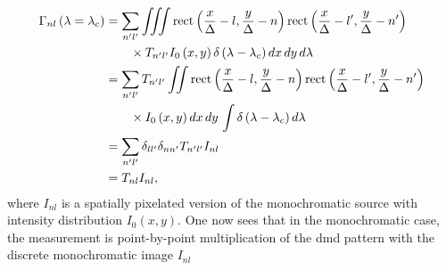\begin{align} \label{eq:MonoChrome}
	\Gamma_{nl} \left(\lambda = \lambda_c \right) &= \sum_{ n^\prime l^\prime} \iiint \mbox{rect} \left( \frac{x}{\Delta} -  l, \frac{y}{\Delta} - n \right)  \mbox{rect} \left( \frac{x}{\Delta} - l^\prime, \frac{y}{\Delta} - n^\prime \right) \notag \\
	&\qquad \times T_{n^\prime l^\prime} I_0 \left( x, y \right) \delta \left( \lambda - \lambda_c \right) dx \, dy \, d\lambda  \notag \\
	&= \sum_{ n^\prime l^\prime} T_{n^\prime l^\prime}  \iint \mbox{rect} \left( \frac{x}{\Delta} -  l, \frac{y}{\Delta} - n \right)  \mbox{rect} \left( \frac{x}{\Delta} - l^\prime, \frac{y}{\Delta} - n^\prime \right) \notag \\
	&\qquad \times I_0 \left( x, y \right) dx \, dy \, \int \delta \left( \lambda - \lambda_c \right)d\lambda  \notag \\
 	&= \sum_{n^\prime l^\prime} \delta_{ll^\prime} \delta_{nn^\prime} T_{n^\prime l^\prime} I_{nl} \notag \\
 	&= T_{nl} I_{nl},
\end{align}
%
where $I_{nl}$ is a spatially pixelated version of the monochromatic source with intensity distribution $I_0 \left(x, y \right)$. One now sees that in the monochromatic case, the measurement is point-by-point multiplication of the \gls{dmd} pattern with the discrete monochromatic image $I_{nl}$

